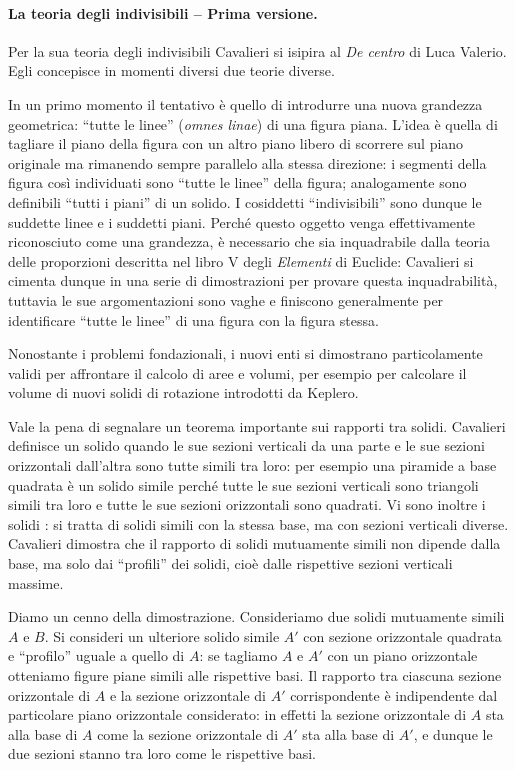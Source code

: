 \paragraph{La teoria degli indivisibili -- Prima versione.} Per la sua teoria degli indivisibili Cavalieri si isipira al \textit{De centro} di Luca Valerio. Egli concepisce in momenti diversi due teorie diverse.
\par In un primo momento il tentativo \`e quello di introdurre una nuova grandezza geometrica: ``tutte le linee'' (\textit{omnes linae}) di una figura piana. L'idea \`e quella di tagliare il piano della figura con un altro piano libero di scorrere sul piano originale ma rimanendo sempre parallelo alla stessa direzione: i segmenti della figura cos\`i individuati sono ``tutte le linee'' della figura; analogamente sono definibili ``tutti i piani'' di un solido. I cosiddetti ``indivisibili'' sono dunque le suddette linee e i suddetti piani. Perch\'e questo oggetto venga effettivamente riconosciuto come una grandezza, \`e necessario che sia inquadrabile dalla teoria delle proporzioni descritta nel libro V degli \textit{Elementi} di Euclide: Cavalieri si cimenta dunque in una serie di dimostrazioni per provare questa inquadrabilit\`a, tuttavia le sue argomentazioni sono vaghe e finiscono generalmente per identificare ``tutte le linee'' di una figura con la figura stessa.
\par Nonostante i problemi fondazionali, i nuovi enti si dimostrano particolamente validi per affrontare il calcolo di aree e volumi, per esempio per calcolare il volume di nuovi solidi di rotazione introdotti da Keplero.
\par Vale la pena di segnalare un teorema importante sui rapporti tra solidi. Cavalieri definisce un solido  quando le sue sezioni verticali da una parte e le sue sezioni orizzontali dall'altra sono tutte simili tra loro: per esempio una piramide a base quadrata \`e un solido simile perch\'e tutte le sue sezioni verticali sono triangoli simili tra loro e tutte le sue sezioni orizzontali sono quadrati. Vi sono inoltre i solidi : si tratta di solidi simili con la stessa base, ma con sezioni verticali diverse. Cavalieri dimostra che il rapporto di solidi mutuamente simili non dipende dalla base, ma solo dai ``profili'' dei solidi, cio\`e dalle rispettive sezioni verticali massime.
\par Diamo un cenno della dimostrazione. Consideriamo due solidi mutuamente simili $A$ e $B$. Si consideri un ulteriore solido simile $A'$ con sezione orizzontale quadrata e ``profilo'' uguale a quello di $A$: se tagliamo $A$ e $A'$ con un piano orizzontale otteniamo figure piane simili alle rispettive basi. Il rapporto tra ciascuna sezione orizzontale di $A$ e la sezione orizzontale di $A'$ corrispondente \`e indipendente dal particolare piano orizzontale considerato: in effetti la sezione orizzontale di $A$ sta alla base di $A$  come la sezione orizzontale di $A'$ sta alla base di $A'$, e dunque le due sezioni stanno tra loro come le rispettive basi.
